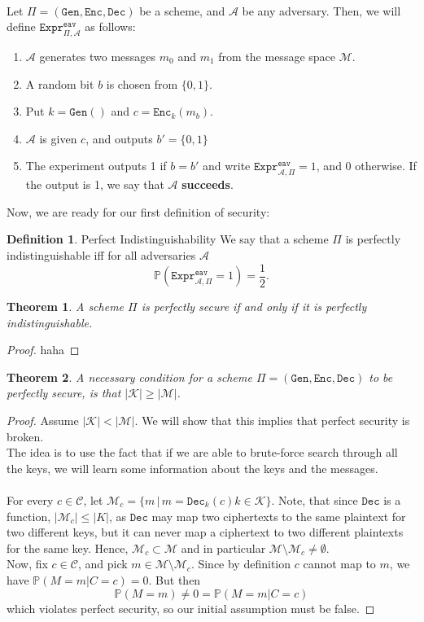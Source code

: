\documentclass{article}
\newtheorem{theorem}{Theorem}[section]
\theoremstyle{definition}
\newtheorem{definition}{Definition}[section]
\newcommand{\Enc}{\texttt{Enc}}
\newcommand{\Dec}{\texttt{Dec}}
\newcommand{\Gen}{\texttt{Gen}}
\renewcommand{\C}{\mathcal{C}}
\newcommand{\M}{\mathcal{M}}
\newcommand{\C}{\mathcal{C}}
\newcommand{\K}{\mathcal{K}}
\newcommand{\A}{\mathcal{A}}
\newcommand{\Prob}{\mathbb{P}}
\newcommand{\Expr}[2]{\texttt{Expr}^{\texttt{#1}}_{#2}}
\begin{document}
\paragraph{}
Let $\Pi = (\Gen, \Enc, \Dec)$ be a scheme, and $\A$ be any adversary.
Then, we will define $\texttt{Expr}^{\texttt{eav}}_{\Pi, \A}$ as
follows:
\begin{enumerate}
\item $\A$ generates two messages $m_0$ and $m_1$ from the message space $\M$.
\item A random bit $b$ is chosen from $\{0, 1\}$.
\item Put $k = \Gen()$ and $c = \Enc_k(m_b)$.
\item $\A$ is given $c$, and outputs $b'= \{0, 1\}$
\item The experiment outputs 1 if $b = b'$ and write $\Expr{eav}{\A, \Pi} = 1$,
  and 0 otherwise. If the output is 1, we say that $\A$ \textbf{succeeds}.
\end{enumerate}
Now, we are ready for our first definition of security:
\begin{definition}{Perfect Indistinguishability}
  \label{def:perfect_indistinguishability}
We say that a scheme $\Pi$ is perfectly indistinguishable iff for all adversaries $\A$
\[
  \Prob(\Expr{eav}{\A, \Pi} = 1) = \frac12.
\]
\end{definition}
\begin{theorem}
  \label{thm:perfect_equivalence}
A scheme $\Pi$ is perfectly secure if and only if it is perfectly indistinguishable.
\end{theorem}
\begin{proof}
  haha
\end{proof}
\begin{theorem}
A necessary condition for a scheme $\Pi = (\Gen, \Enc, \Dec)$ to be perfectly secure, is that $|\K|
\geq |\M|$.
\end{theorem}
\begin{proof}
  Assume $|\K| < |\M|$. We will show that this implies that perfect security is broken.\\
  The idea is to use the fact that if we are able to brute-force search through
  all the keys, we will learn some information about the keys and the messages.
  \paragraph{}
  For every $c \in \C$, let $\M_c = \{m \,|\, m = \Dec_k(c) k \in \K\}$.
  Note, that since $\Dec$ is a function, $|\M_c| \leq |K|$, as $\Dec$ may map two ciphertexts
  to the same plaintext for two different keys, but it can never map a
  ciphertext to two different plaintexts for the same key. Hence, $\M_c \subset
  \M$ and in particular $\M \setminus \M_c \neq \emptyset$.\\
  Now, fix $c \in \C$, and pick $m \in \M \setminus \M_c$. Since by definition
  $c$ cannot map to $m$, we have $\Prob(M=m | C = c) = 0$. But then
  \[
    \Prob(M=m) \neq 0 = \Prob(M=m | C=c)
  \]
  which violates perfect security, so our initial assumption must be false.
\end{proof}
\end{document}
